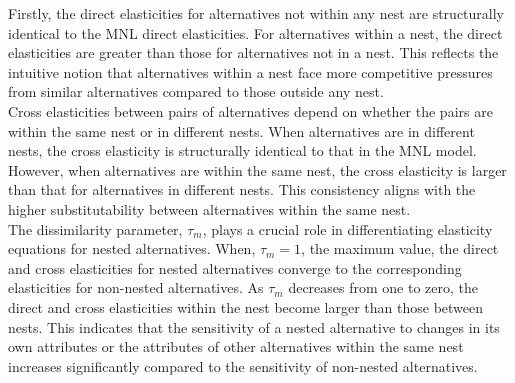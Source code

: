 \documentclass[a4paper,11pt]{article}
\begin{document}
    Firstly, the direct elasticities for alternatives not within any nest are structurally identical to the MNL direct elasticities. For alternatives within a nest, the direct elasticities are greater than those for alternatives not in a nest. This reflects the intuitive notion that alternatives within a nest face more competitive pressures from similar alternatives compared to those outside any nest.\\

    Cross elasticities between pairs of alternatives depend on whether the pairs are within the same nest or in different nests. When alternatives are in different nests, the cross elasticity is structurally identical to that in the MNL model. However, when alternatives are within the same nest, the cross elasticity is larger than that for alternatives in different nests. This consistency aligns with the higher substitutability between alternatives within the same nest.\\

    The dissimilarity parameter, $\tau_{m}$, plays a crucial role in differentiating elasticity equations for nested alternatives. When, $\tau_{m} = 1$, the maximum value, the direct and cross elasticities for nested alternatives converge to the corresponding elasticities for non-nested alternatives. As $\tau_{m}$ decreases from one to zero, the direct and cross elasticities within the nest become larger than those between nests. This indicates that the sensitivity of a nested alternative to changes in its own attributes or the attributes of other alternatives within the same nest increases significantly compared to the sensitivity of non-nested alternatives.\\
\end{document}
